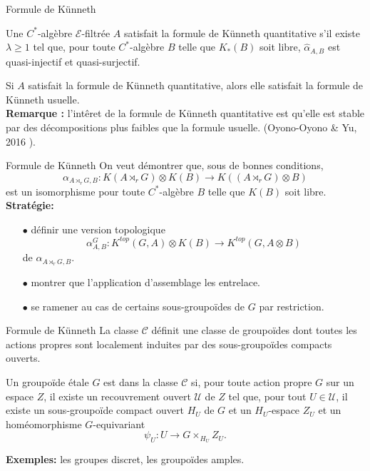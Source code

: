 \begin{frame}{Formule de Künneth}
\begin{definitionfr}
Une $C^*$-algèbre $\mathcal E$-filtrée $A$ satisfait la formule de Künneth quantitative s'il existe $\lambda \geq 1$ tel que, pour toute $C^*$-algèbre $B$ telle que $K_*(B)$ soit libre, $\hat\alpha_{A,B}$ est quasi-injectif et quasi-surjectif. 
\end{definitionfr}

Si $A$ satisfait la formule de Künneth quantitative, alors elle satisfait la formule de Künneth usuelle.\\
\vspace{0.3 cm}
\textbf{Remarque :} l'intêret de la formule de Künneth quantitative est qu'elle est stable par des décompositions plus faibles que la formule usuelle. (Oyono-Oyono \& Yu, 2016 \cite{OY4}).
\end{frame}


\begin{frame}{Formule de Künneth}
On veut démontrer que, sous de bonnes conditions,  
\[\alpha_{A\rtimes_r G,B} : K(A\rtimes_r G)\otimes K(B) \rightarrow K((A\rtimes_r G)\otimes B)\]
est un isomorphisme pour toute $C^*$-algèbre $B$ telle que $K(B)$ soit libre.\\
\vspace{0.3 cm}
\textbf{Stratégie:}
\begin{itemize}
\item[$\bullet$] définir une version topologique 
\[\alpha_{A,B}^{G} : K^{top}(G,A)\otimes K(B) \rightarrow K^{top}(G,A\otimes B)\]
de $\alpha_{A\rtimes_r G,B}$.
\item[$\bullet$] montrer que l'application d'assemblage les entrelace.
\item[$\bullet$] se ramener au cas de certains sous-groupoïdes de $G$ par restriction.
\end{itemize}
\end{frame}

\begin{frame}{Formule de Künneth}
La classe $\mathcal C$ définit une classe de groupoïdes dont toutes les actions propres sont localement induites par des sous-groupoïdes compacts ouverts. 
\vspace{0.3 cm}
\begin{definitionfr}
Un groupoïde étale $G$ est dans la classe $\mathcal C$ si, pour toute action propre $G$ sur un espace $Z$, il existe un recouvrement ouvert $\mathcal U$ de $Z$ tel que, pour tout $U\in\mathcal U$, il existe un sous-groupoïde compact ouvert $H_U$ de $G$ et un $H_U$-espace $Z_U$ et un homéomorphisme $G$-equivariant
\[\psi_U : U \rightarrow G\times_{H_U} Z_U.\] 
\end{definitionfr}
\vspace{0.3 cm}
\textbf{Exemples:} les groupes discret, les groupoïdes amples.

\end{frame}


